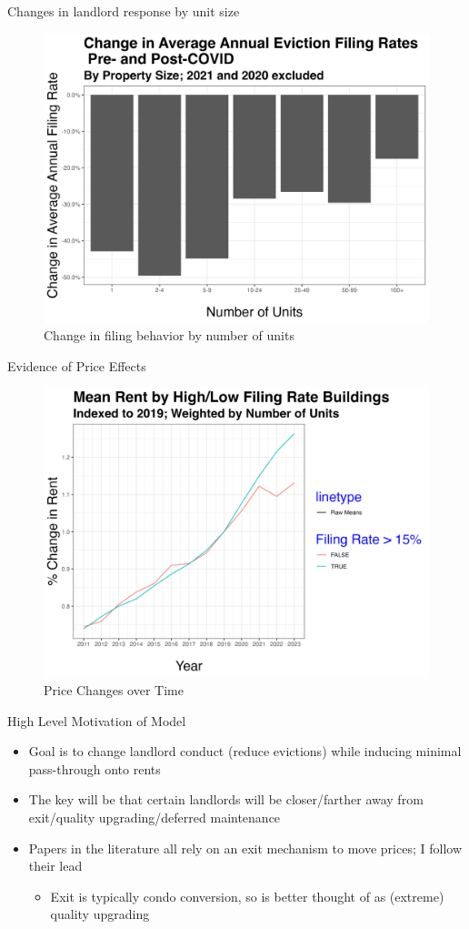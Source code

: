 \documentclass[10pt, xcolor=dvipsnames]{beamer}
\begin{document}
\begin{frame}{Changes in landlord response by unit size}
    \begin{figure}
        \centering
        \includegraphics[width=0.75\linewidth]{figs/change_in_avg_annual_eviction_filing_rates_pre_post_COVID_by_num_units.png}
        \caption{Change in filing behavior by number of units}
        \label{fig:change-evict-units}
    \end{figure}
\end{frame}

\begin{frame}{Evidence of Price Effects}
    \begin{figure}
        \centering
        \includegraphics[width=0.5\linewidth]{figs/mean_price_quintile.png}
        \caption{Price Changes over Time}
        \label{fig:price-high-filing}
    \end{figure}
    
\end{frame}

\begin{frame}{High Level Motivation of Model}
\begin{itemize}
    \item Goal is to change landlord conduct (reduce evictions) while inducing minimal pass-through onto rents
    \item The key will be that certain landlords will be closer/farther away from exit/quality upgrading/deferred maintenance 
    \item Papers in the literature \cite{diamond-2019, collinson2024eviction, } all rely on an exit mechanism to move prices; I follow their lead
    \begin{itemize}
        \item Exit is typically condo conversion, so is better thought of as (extreme) quality upgrading
    \end{itemize}
\end{itemize}
    
\end{frame}
\end{document}
